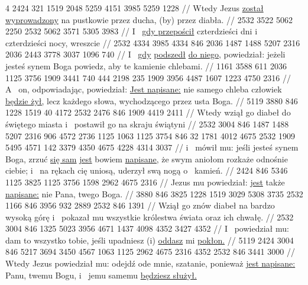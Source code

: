 \begingl
\lettrine[loversize=1,lraise=-1.3]{4 }{}%
 2424 321 1519 2048 5259 4151 {} 3985 5259 1228
//
\glb
 Wtedy Jezus \underline{został wyprowadzony} na pustkowie przez ducha, (by)  przez diabła.
//
\endgl
\begingl
\gla
{} 2532 3522 5062 2250 2532 5062 3571 5305 3983
//
\glb
{} I~ \underline{gdy przepościł} czterdzieści dni i~ czterdzieści nocy, wreszcie 
//
\endgl
\begingl
\gla
{} 2532 4334 3985 4334 846 2036 1487 1488 5207 2316 2036 2443 3778 3037 1096 740
//
\glb
{} I~ \underline{gdy}  \underline{podszedł} \underline{do niego,} powiedział: jeżeli jesteś synem Boga powiedz, aby te kamienie  chlebami.
//
\endgl
\begingl
\gla
{} 1161 3588 611 2036 1125 3756 1909 3441 740 444 2198 235 1909 3956 4487 1607 1223 4750 2316
//
\glb
{} A~ on, odpowiadając, powiedział: \underline{Jest napisane:} nie  samego chleba człowiek \underline{będzie żył,} lecz  każdego słowa, wychodzącego przez usta Boga.
//
\endgl
\begingl
\gla
{} 5119 3880 846 1228 1519 40 4172 2532 2476 846 1909 4419 2411
//
\glb
{} Wtedy wziął go diabeł do świętego miasta i~ postawił go na skraju świątyni
//
\endgl
\begingl
\gla
{} 2532 3004 846 1487 1488 5207 2316 906 4572 2736 1125 1063 1125 3754 846 32 1781 4012 4675 2532 1909 5495 4571 142 3379 4350 4675 4228 4314 3037
//
\glb
{} i~ mówił mu: jeśli jesteś synem Boga, zrzuć \underline{się sam}  \underline{jest} bowiem \underline{napisane,} że swym aniołom rozkaże odnośnie ciebie; i~ na rękach cię uniosą,  uderzył swą nogą o~ kamień.
//
\endgl
\begingl
\gla
{} 2424 846 5346 1125 3825 1125 3756 1598 2962 4675 2316
//
\glb
{} Jezus mu powiedział: \underline{jest} także \underline{napisane:} nie  Pana, twego Boga.
//
\endgl
\begingl
\gla
{} 3880 846 3825 1228 1519 3029 5308 3735 2532 1166 846 3956 932 2889 2532 846 1391
//
\glb
{} Wziął go znów diabeł na bardzo wysoką górę i~ pokazał mu wszystkie królestwa świata oraz ich chwałę.
//
\endgl
\begingl
\gla
{} 2532 3004 846 1325 5023 3956 4671 1437 4098 {} 4352 3427 4352
//
\glb
{} I~ powiedział mu: dam to wszystko tobie, jeśli upadniesz (i) \underline{oddasz} mi \underline{pokłon.}
//
\endgl
\begingl
\gla
{} 5119 2424 3004 846 5217 3694 3450 4567 1063 1125 2962 4675 2316 4352 2532 846 3441 3000
//
\glb
{} Wtedy Jezus powiedział mu: odejdź ode mnie, szatanie, ponieważ \underline{jest napisane:} Panu, twemu Bogu,  i~ jemu samemu \underline{będziesz służył.}
